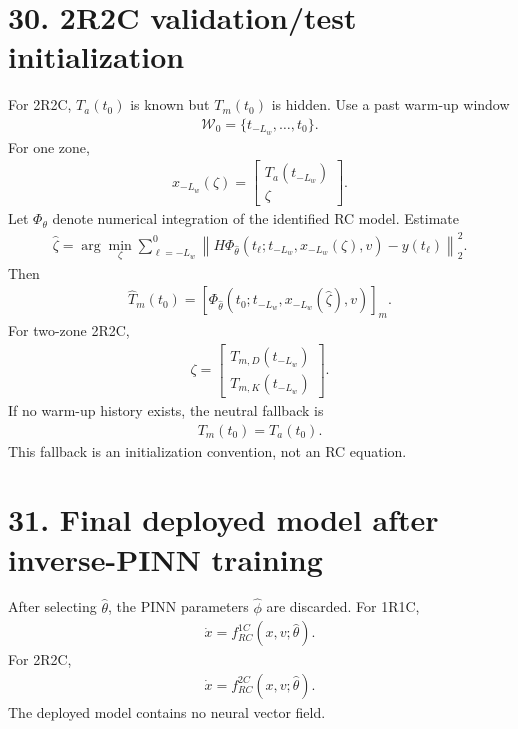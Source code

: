 \documentclass[11pt]{article}
\begin{document}
\section*{30. 2R2C validation/test initialization}
For 2R2C, \(T_a(t_0)\) is known but \(T_m(t_0)\) is hidden. Use a past warm-up window
\begin{align}
\mathcal W_0=\{t_{-L_w},\ldots,t_0\}.
\end{align}
For one zone,
\begin{align}
x_{-L_w}(\zeta)=\begin{bmatrix}T_a(t_{-L_w})\\\zeta\end{bmatrix}.
\end{align}
Let \(\Phi_\theta\) denote numerical integration of the identified RC model. Estimate
\begin{align}
\boxed{\widehat\zeta=\arg\min_\zeta\sum_{\ell=-L_w}^{0}\left\|H\Phi_{\widehat\theta}\left(t_\ell;t_{-L_w},x_{-L_w}(\zeta),v\right)-y(t_\ell)\right\|_2^2.}
\tag{P2.125}
\end{align}
Then
\begin{align}
\boxed{\widehat T_m(t_0)=\left[\Phi_{\widehat\theta}\left(t_0;t_{-L_w},x_{-L_w}(\widehat\zeta),v\right)\right]_m.}
\tag{P2.126}
\end{align}
For two-zone 2R2C,
\begin{align}
\zeta=\begin{bmatrix}T_{m,D}(t_{-L_w})\\T_{m,K}(t_{-L_w})\end{bmatrix}.
\end{align}
If no warm-up history exists, the neutral fallback is
\begin{align}
\boxed{T_m(t_0)=T_a(t_0).}
\tag{P2.127}
\end{align}
This fallback is an initialization convention, not an RC equation.

\section*{31. Final deployed model after inverse-PINN training}
After selecting \(\widehat\theta\), the PINN parameters \(\widehat\phi\) are discarded. For 1R1C,
\begin{align}
\boxed{\dot x=f_{RC}^{1C}\left(x,v;\widehat\theta\right).}
\tag{P2.128}
\end{align}
For 2R2C,
\begin{align}
\boxed{\dot x=f_{RC}^{2C}\left(x,v;\widehat\theta\right).}
\tag{P2.129}
\end{align}
The deployed model contains no neural vector field.
\end{document}
